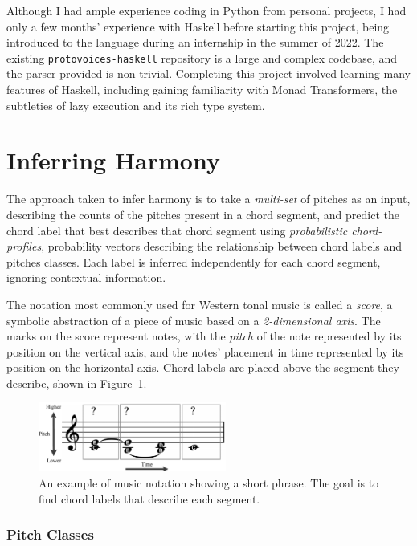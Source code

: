 \documentclass[12pt,a4paper,twoside,openany]{report} \usepackage[pdfborder={0 0 0}]{hyperref}    %
\theoremstyle{definition} \newtheorem{definition}{Definition}[section]
\begin{document}
Although I had ample experience coding in Python from personal projects, I had only a few months' experience with Haskell before starting this project, being introduced to the language during an internship in the summer of 2022. 
The existing \texttt{protovoices-haskell} repository is a large and complex codebase, and the parser provided is non-trivial. 
Completing this project involved learning many features of Haskell, including gaining familiarity with Monad Transformers, the subtleties of lazy execution and its rich type system.


\section{Inferring Harmony}
\label{sec:inferringHarmony}

The approach taken to infer harmony is to take a \textit{multi-set} of pitches as an input, describing the counts of the
pitches present in a chord segment, and predict the chord label that best describes that chord segment using
\textit{probabilistic chord-profiles}, probability vectors describing the relationship between chord labels and pitches
classes.
Each label is inferred independently for each chord segment, ignoring contextual information.

The notation most commonly used for Western tonal music is called a \textit{score}, a symbolic abstraction of a piece of music based on a \textit{2-dimensional axis}.
The marks on the score represent notes, with the \textit{pitch} of the note represented by its position on the vertical
axis, and the notes' placement in time represented by its position on the horizontal axis. Chord labels are placed above
the segment they describe, shown in Figure~\ref{fig:pitchTime}.

\begin{figure}[ht] 
\centering \includegraphics[width=0.55\textwidth]{prep/inferringHarmony/pitchTime.pdf}
\captionsetup{width=.7\linewidth} \caption{An example of music notation showing a short phrase. The goal is to find
chord labels that describe each segment.}
\label{fig:pitchTime} 
\end{figure} 

\subsubsection{Pitch Classes}
\label{sub:pitches}
\end{document}
